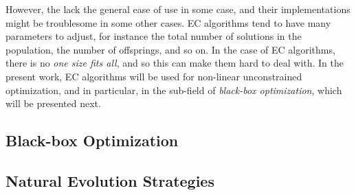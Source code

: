 However, the lack the general ease of use in some case, and their implementations might be 
troublesome in some other cases. EC algorithms tend to have many parameters to adjust, for 
instance the total number of solutions in the population, the number of offsprings, and so 
on. In the case of EC algorithms, there is no \emph{one size fits all}, and so this can 
make them hard to deal with. In the present work, EC algorithms will be used for non-linear 
unconstrained optimization, and in particular, in the sub-field of 
\emph{black-box optimization}, which will be presented next.

\subsection{Black-box Optimization}
\subsection{Natural Evolution Strategies}